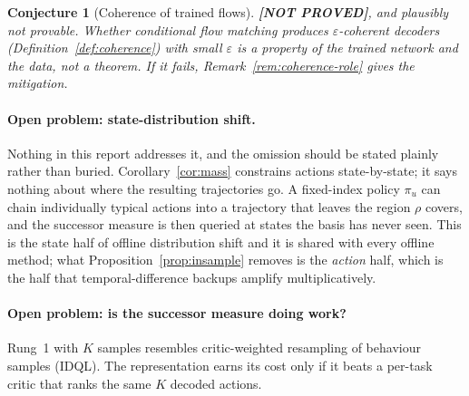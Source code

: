 \documentclass[11pt]{article}
\theoremstyle{plain}
\newtheorem{conjecture}{Conjecture}
\theoremstyle{definition}
\theoremstyle{remark}
\newcommand{\1}{\mathbf 1}
\newcommand{\NOTPROVED}{\textbf{\textup{[NOT PROVED]}}}
\begin{document}
\begin{conjecture}[Coherence of trained flows]
\label{conj:coherence}
\NOTPROVED, \emph{and plausibly not provable.} Whether conditional flow matching produces
$\varepsilon$-coherent decoders (Definition~\ref{def:coherence}) with small $\varepsilon$ is
a property of the trained network and the data, not a theorem. If it fails,
Remark~\ref{rem:coherence-role} gives the mitigation.
\end{conjecture}

\paragraph{Open problem: state-distribution shift.}
Nothing in this report addresses it, and the omission should be stated plainly rather than
buried. Corollary~\ref{cor:mass} constrains actions state-by-state; it says nothing about
where the resulting trajectories go. A fixed-index policy $\pi_u$ can chain individually
typical actions into a trajectory that leaves the region $\rho$ covers, and the successor
measure is then queried at states the basis has never seen. This is the state half of
offline distribution shift and it is shared with every offline method; what
Proposition~\ref{prop:insample} removes is the \emph{action} half, which is the half that
temporal-difference backups amplify multiplicatively.

\paragraph{Open problem: is the successor measure doing work?}
Rung~1 with $K$ samples resembles critic-weighted resampling of behaviour samples (IDQL).
The representation earns its cost only if it beats a per-task critic that ranks the same
$K$ decoded actions.
\end{document}
